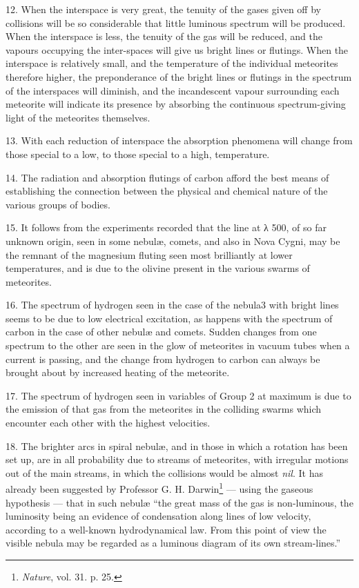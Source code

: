 \documentclass[a4paper, 12pt, oneside, polutonikogreek, english]{article}
\begin{document}
12. When the interspace is very great, the tenuity of the gases given off by collisions will be so considerable that little luminous spectrum will be produced. When the interspace is less, the tenuity of the gas will be reduced, and the vapours occupying the inter-spaces will give us bright lines or flutings. When the interspace is relatively small, and the temperature of the individual meteorites therefore higher, the preponderance of the bright lines or flutings in the spectrum of the interspaces will diminish, and the incandescent vapour surrounding each meteorite will indicate its presence by absorbing the continuous spectrum-giving light of the meteorites themselves.

13. With each reduction of interspace the absorption phenomena will change from those special to a low, to those special to a high, temperature.

14. The radiation and absorption flutings of carbon afford the best means of establishing the connection between the physical and chemical nature of the various groups of bodies.

15. It follows from the experiments recorded that the line at λ 500, of so far unknown origin, seen in some nebulæ, comets, and also in Nova Cygni, may be the remnant of the magnesium fluting seen most brilliantly at lower temperatures, and is due to the olivine present in the various swarms of meteorites.

16. The spectrum of hydrogen seen in the case of the nebula3 with bright lines seems to be due to low electrical excitation, as happens with the spectrum of carbon in the case of other nebulæ and comets. Sudden changes from one spectrum to the other are seen in the glow of meteorites in vacuum tubes when a current is passing, and the change from hydrogen to carbon can always be brought about by increased heating of the meteorite.

17. The spectrum of hydrogen seen in variables of Group 2 at maximum is due to the emission of that gas from the meteorites in the colliding swarms which encounter each other with the highest velocities.

18. The brighter arcs in spiral nebulæ, and in those in which a rotation has been set up, are in all probability due to streams of meteorites, with irregular motions out of the main streams, in which the collisions would be almost \emph{nil}. It has already been suggested by Professor G. H. Darwin\footnote{\emph{Nature}, vol. 31. p. 25.} --- using the gaseous hypothesis --- that in such nebulæ ``the great mass of the gas is non-luminous, the luminosity being an evidence of condensation along lines of low velocity, according to a well-known hydrodynamical law. From this point of view the visible nebula may be regarded as a luminous diagram of its own stream-lines.''
\end{document}

